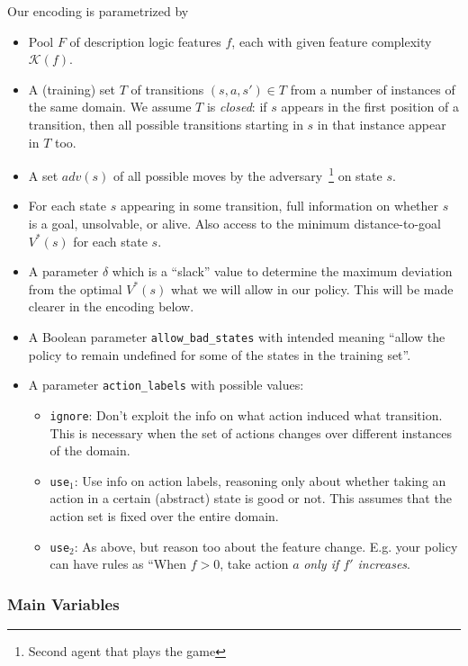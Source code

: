 \documentclass[a4paper]{article}
\begin{document}
Our encoding is parametrized by
\begin{itemize}
 \item Pool $F$ of description logic features $f$, each with given feature complexity $\mathcal{K}(f)$.
 \item A (training) set $T$ of transitions $(s, a, s') \in T$ from a number of instances of the same domain.
       We assume $T$ is \emph{closed}: if $s$ appears in the first position of a transition, then all possible
       transitions starting in $s$ in that instance appear in $T$ too.
 \item A set $adv(s)$ of all possible moves by the adversary~\footnote{Second agent that plays the game} on state $s$.

 \item For each state $s$ appearing in some transition, full information on whether $s$
       is a goal, unsolvable, or alive.
       Also access to the minimum distance-to-goal $V^*(s)$ for each state $s$.
 \item A parameter $\delta$ which is a ``slack'' value to determine the maximum deviation from the optimal $V^*(s)$
 what we will allow in our policy. This will be made clearer in the encoding below.

 \item A Boolean parameter \texttt{allow\_bad\_states} with intended meaning ``allow the policy
        to remain undefined for some of the states in the training set''.
 \item A parameter \texttt{action\_labels} with possible values:
 \begin{itemize}
   \item \texttt{ignore}: Don't exploit the info on what action induced what transition. This is necessary
  when the set of actions changes over different instances of the domain.
   \item \texttt{use$_1$}: Use info on action labels, reasoning only about whether taking an action in a certain
   (abstract) state is good or not. This assumes that the action set is fixed over the entire domain.
   \item \texttt{use$_2$}: As above, but reason too about the feature change. E.g. your policy can have rules as
  ``When $f>0$, take action $a$ \emph{only if $f'$ increases}.
 \end{itemize}
\end{itemize}


\subsubsection{Main Variables}
\end{document}
